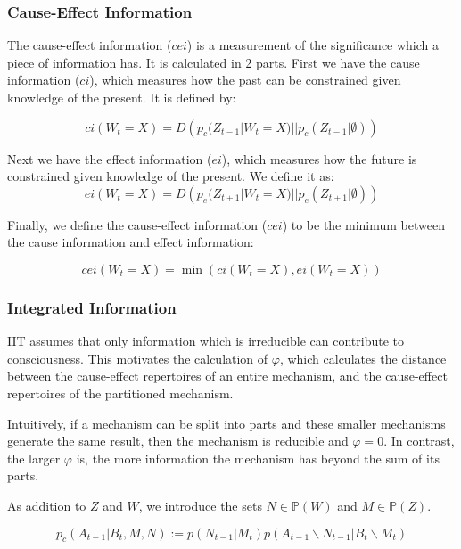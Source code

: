\subsubsection{Cause-Effect Information}
The cause-effect information ($cei$) is a measurement of the significance which a piece of information has. It is calculated in 2 parts. First we have the cause information ($ci$), which measures how the past can be constrained given knowledge of the present. It is defined by:

\begin{equation}
\label{def:ci}
ci(W_{t} = X) = D\left(p_c(Z_{t-1}|W_{t} = X)||p_c(Z_{t-1}|\emptyset)\right)
\end{equation}


Next we have the effect information ($ei$), which measures how the future is constrained given knowledge of the present. We define it as:
\begin{equation}
\label{def:ei}
ei(W_{t} = X) = D\left(p_e(Z_{t+1}|W_{t} = X)||p_{e}(Z_{t+1}|\emptyset)\right)
\end{equation}

Finally, we define the cause-effect information ($cei$) to be the minimum between the cause information and effect information:

\begin{equation}
\label{def:cei}
cei(W_{t} = X) = \min\left(ci(W_{t} = X), ei(W_{t} = X) \right)
\end{equation}

\subsubsection{Integrated Information}
\label{sec:mech_integration}
IIT assumes that only information which is irreducible can contribute to consciousness. This motivates the calculation of $\varphi$, which calculates the distance between the cause-effect repertoires of an entire mechanism, and the cause-effect repertoires of the partitioned mechanism. 

Intuitively, if a mechanism can be split into parts and these smaller mechanisms generate the same result, then the mechanism is reducible and $\varphi=0$. In contrast, the larger $\varphi$ is, the more information the mechanism has beyond the sum of its parts.

As addition to $Z$ and $W$, we introduce the sets $N \in \mathbb{P}(W)$ and $M \in \mathbb{P}(Z)$.

\begin{equation}
\label{def:preMIP}
p_c(A_{t-1}|B_t ,M, N):= p(N_{t-1}|M_t) p(A_{t-1} \backslash N_{t-1} |B_t \backslash M_t)
\end{equation}


